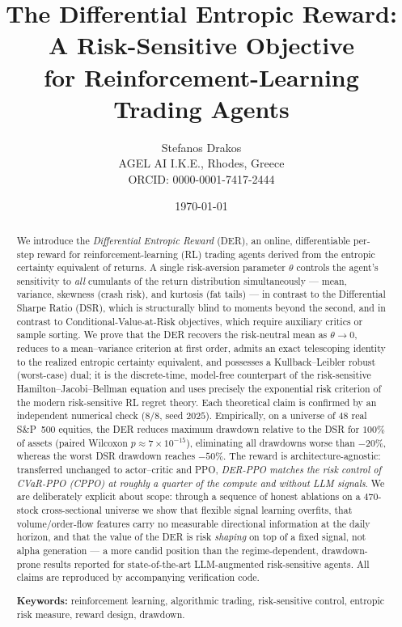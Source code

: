 \documentclass[11pt]{article}
\title{\textbf{The Differential Entropic Reward: A Risk-Sensitive Objective\\
for Reinforcement-Learning Trading Agents}}
\author{Stefanos Drakos\\
\small AGEL AI I.K.E., Rhodes, Greece\\
\small ORCID: 0000-0001-7417-2444}
\date{\today}
\theoremstyle{definition}
\begin{document}
\maketitle

\begin{abstract}
\noindent
We introduce the \emph{Differential Entropic Reward} (DER), an online,
differentiable per-step reward for reinforcement-learning (RL) trading agents
derived from the entropic certainty equivalent of returns. A single risk-aversion
parameter $\theta$ controls the agent's sensitivity to \emph{all} cumulants of the
return distribution simultaneously --- mean, variance, skewness (crash risk), and
kurtosis (fat tails) --- in contrast to the Differential Sharpe Ratio (DSR), which is
structurally blind to moments beyond the second, and in contrast to
Conditional-Value-at-Risk objectives, which require auxiliary critics or sample
sorting. We prove that the DER recovers the risk-neutral mean as $\theta\to0$, reduces
to a mean--variance criterion at first order, admits an exact telescoping identity
to the realized entropic certainty equivalent, and possesses a Kullback--Leibler
robust (worst-case) dual; it is the discrete-time, model-free counterpart of the
risk-sensitive Hamilton--Jacobi--Bellman equation and uses precisely the exponential
risk criterion of the modern risk-sensitive RL regret theory. Each theoretical claim
is confirmed by an independent numerical check ($8/8$, seed $2025$). Empirically, on
a universe of $48$ real S\&P~500 equities, the DER reduces maximum drawdown relative
to the DSR for \emph{$100\%$} of assets (paired Wilcoxon $p\approx7\times10^{-15}$),
eliminating all drawdowns worse than $-20\%$, whereas the worst DSR drawdown reaches
$-50\%$. The reward is architecture-agnostic: transferred unchanged to actor--critic
and PPO, \emph{DER-PPO matches the risk control of CVaR-PPO (CPPO) at roughly a quarter
of the compute and without LLM signals}. We are deliberately explicit about scope: through a sequence of honest
ablations on a $470$-stock cross-sectional universe we show that flexible signal
learning overfits, that volume/order-flow features carry no measurable directional
information at the daily horizon, and that the value of the DER is risk \emph{shaping}
on top of a fixed signal, not alpha generation --- a more candid position than the
regime-dependent, drawdown-prone results reported for state-of-the-art LLM-augmented
risk-sensitive agents. All claims are reproduced by accompanying verification code.

\medskip
\noindent\textbf{Keywords:} reinforcement learning, algorithmic trading, risk-sensitive
control, entropic risk measure, reward design, drawdown.
\end{abstract}
\end{document}
